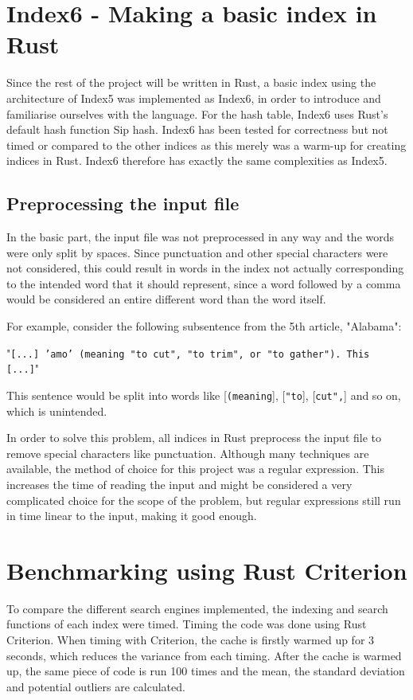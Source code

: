 \section{Index6 - Making a basic index in Rust}
Since the rest of the project will be written in Rust, a basic index using the architecture of Index5 was implemented as Index6, in order to introduce and familiarise ourselves with the language. For the hash table, Index6 uses Rust's default hash function Sip hash\cite{Siphash}. Index6 has been tested for correctness but not timed or compared to the other indices as this merely was a warm-up for creating indices in Rust. Index6 therefore has exactly the same complexities as Index5. 

\subsection{Preprocessing the input file}

In the basic part, the input file was not preprocessed in any way and the words were only split by spaces. Since punctuation and other special characters were not considered, this could result in words in the index not actually corresponding to the intended word that it should represent, since a word followed by a comma would be considered an entire different word than the word itself. 

\newpage
For example, consider the following subsentence from the 5th article, "Alabama":

\begin{center}
    "\texttt{[...] 'amo' (meaning "to cut", "to trim", or "to gather"). This [...]}"
\end{center}

This sentence would be split into words like [\texttt{(meaning}], [\texttt{"to}], [\texttt{cut",}] and so on, which is unintended. 

In order to solve this problem, all indices in Rust preprocess the input file to remove special characters like punctuation. Although many techniques are available, the method of choice for this project was a regular expression. This increases the time of reading the input and might be considered a very complicated choice for the scope of the problem, but regular expressions still run in time linear to the input, making it good enough. 

\section{Benchmarking using Rust Criterion}
To compare the different search engines implemented, the indexing and search functions of each index were timed. Timing the code was done using Rust Criterion. When timing with Criterion, the cache is firstly warmed up for 3 seconds, which reduces the variance from each timing. After the cache is warmed up, the same piece of code is run 100 times and the mean, the standard deviation and potential outliers are calculated.

